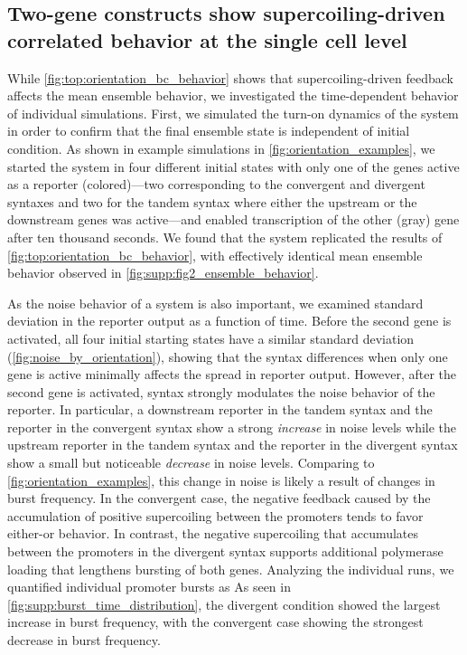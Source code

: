 \documentclass[11pt]{article}
\begin{document}
\subsection{Two-gene constructs show supercoiling-driven correlated behavior at the single cell level}
While \cref{fig:top:orientation_bc_behavior} shows that supercoiling-driven feedback affects the mean ensemble behavior, we investigated the time-dependent behavior of individual simulations.
First, we simulated the turn-on dynamics of the system in order to confirm that the final ensemble state is independent of initial condition.
As shown in example simulations in \cref{fig:orientation_examples}, we started the system in four different initial states with only one of the genes active as a reporter (colored)---two corresponding to the convergent and divergent syntaxes and two for the tandem syntax where either the upstream or the downstream genes was active---and enabled transcription of the other (gray) gene after ten thousand seconds.
We found that the system replicated the results of \cref{fig:top:orientation_bc_behavior}, with effectively identical mean ensemble behavior observed in \cref{fig:supp:fig2_ensemble_behavior}.

As the noise behavior of a system is also important, we examined standard deviation in the reporter output as a function of time. Before the second gene is activated, all four initial starting states have a similar standard deviation (\cref{fig:noise_by_orientation}), showing that the syntax differences when only one gene is active minimally affects the spread in reporter output. However, after the second gene is activated, syntax strongly modulates the noise behavior of the reporter. In particular, a downstream reporter in the tandem syntax and the reporter in the convergent syntax show a strong \emph{increase} in noise levels while the upstream reporter in the tandem syntax and the reporter in the divergent syntax show a small but noticeable \emph{decrease} in noise levels. Comparing to \cref{fig:orientation_examples}, this change in noise is likely a result of changes in burst frequency. In the convergent case, the negative feedback caused by the accumulation of positive supercoiling between the promoters tends to favor either-or behavior. In contrast, the negative supercoiling that accumulates between the promoters in the divergent syntax supports additional polymerase loading that lengthens bursting of both genes.
Analyzing the individual runs, we quantified individual promoter bursts as %
As seen in \cref{fig:supp:burst_time_distribution}, the divergent condition showed the largest increase in burst frequency, with the convergent case showing the strongest decrease in burst frequency. %
\end{document}

